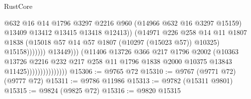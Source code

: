 \begin{lexlean}{RustCore}
\begin{coremodule}
                                                    @632
                                                    @16
                                                    @14
                                                    @1796
                                                    @3297
                                                    @2216
                                                    @960
                                                    (@14966 @632 @16 @3297 @15159)
                                                    @13409
                                                    @13412
                                                    @13415
                                                    @13418
                                                    @12413))
                                                (@14971
                                                  @226
                                                  @258
                                                  @14
                                                  @11
                                                  @1807
                                                  @1838
                                                  (@15018
                                                    @57
                                                    @14
                                                    @57
                                                    @1807
                                                    (@10297 (@15023 @57))
                                                    @10325)
                                                  @15158)))))))
                                    @13449)))
                              (@11406
                                @13726
                                @366
                                @217
                                @1796
                                @2002
                                (@10363
                                  @13726
                                  @2216
                                  @232
                                  @217
                                  @258
                                  @11
                                  @1796
                                  @1838
                                  @2000
                                  @10375
                                  @13843
                                  @11425)))))))))))))))
@15306 := @9765 @72
@15310 := @9767 (@9771 @72) (@9777 @72)
@15311 := @9786 @11986
@15313 := @9782 (@15311 @9801)
@15315 := @9824 (@9825 @72)
@15316 := @9820 @15315

\end{coremodule}
\end{lexlean}
